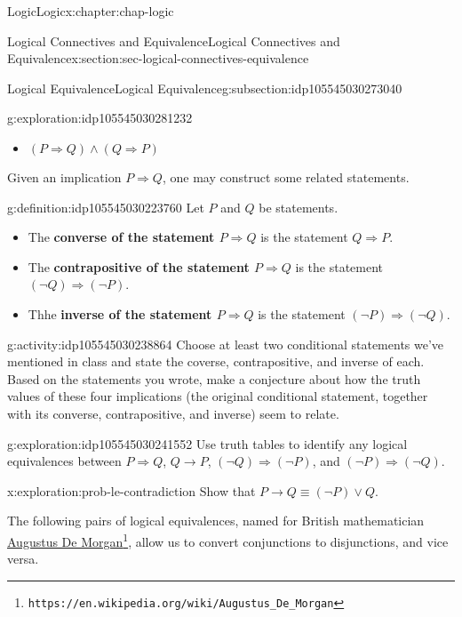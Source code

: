 \documentclass[oneside,10pt,]{book}
\newcommand{\terminology}[1]{\textbf{#1}}
\begin{document}
\begin{chapterptx}{Logic}{}{Logic}{}{}{x:chapter:chap-logic}
\begin{sectionptx}{Logical Connectives and Equivalence}{}{Logical Connectives and Equivalence}{}{}{x:section:sec-logical-connectives-equivalence}
\begin{subsectionptx}{Logical Equivalence}{}{Logical Equivalence}{}{}{g:subsection:idp105545030273040}
\begin{exploration}{}{g:exploration:idp105545030281232}
\begin{itemize}[label=\textbullet]
\item{}\(\displaystyle (P\Rightarrow Q)\land (Q\Rightarrow P)\)%
\end{itemize}
\end{exploration}%
Given an implication \(P\Rightarrow Q\), one may construct some related statements.%
\begin{definition}{}{g:definition:idp105545030223760}%
%
%
%
%
%
%
Let \(P\) and \(Q\) be statements.%
%
\begin{itemize}[label=\textbullet]
\item{}The \terminology{converse of the statement \(P\Rightarrow Q\)} is the statement \(Q\Rightarrow P\).%
\item{}The \terminology{contrapositive of the statement \(P\Rightarrow Q\)} is the statement \((\neg Q)\Rightarrow (\neg P)\).%
\item{}Thhe \terminology{inverse of the statement \(P\Rightarrow Q\)} is the statement \((\neg P)\Rightarrow (\neg Q)\).%
\end{itemize}
\end{definition}
\begin{activity}{}{g:activity:idp105545030238864}%
Choose at least two conditional statements we've mentioned in class and state the coverse, contrapositive, and inverse of each. Based on the statements you wrote, make a conjecture\footnotemark{} about how the truth values of these four implications (the original conditional statement, together with its converse, contrapositive, and inverse) seem to relate.%
\end{activity}%
%
\begin{exploration}{}{g:exploration:idp105545030241552}%
Use truth tables to identify any logical equivalences between \(P\Rightarrow Q\), \(Q\rightarrow P\), \((\neg Q)\Rightarrow (\neg P)\), and \((\neg P)\Rightarrow (\neg Q)\).%
\end{exploration}%
\begin{exploration}{}{x:exploration:prob-le-contradiction}%
Show that \(P\rightarrow Q \equiv (\neg P) \lor Q\).%
\end{exploration}%
The following pairs of logical equivalences, named for British mathematician \href{https://en.wikipedia.org/wiki/Augustus_De_Morgan}{Augustus De Morgan}\footnote{\nolinkurl{https://en.wikipedia.org/wiki/Augustus_De_Morgan}\label{g:fn:idp105545030251152}}, allow us to convert conjunctions to disjunctions, and vice versa.%

\end{subsectionptx}
\end{sectionptx}
\end{chapterptx}
\end{document}
